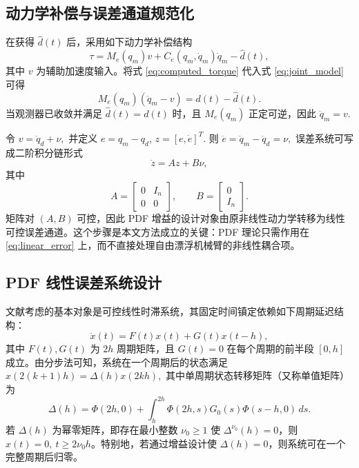 \subsection{动力学补偿与误差通道规范化}

在获得 \(\hat d(t)\) 后，采用如下动力学补偿结构
\begin{equation}
\tau=M_e(q_m)v+C_e(q_m,\dot q_m)\dot q_m-\hat d(t),
\label{eq:computed_torque}
\end{equation}
其中 \(v\) 为辅助加速度输入。将式 \eqref{eq:computed_torque} 代入式 \eqref{eq:joint_model} 可得
\[
M_e(q_m)(\ddot q_m-v)=d(t)-\hat d(t).
\]
当观测器已收敛并满足 \(\hat d(t)=d(t)\) 时，且 \(M_e(q_m)\) 正定可逆，因此
\(
\ddot q_m=v.
\)

令
\(
v=\ddot q_d+\nu ,
\)
并定义
\(
e=q_m-q_d\),
\(z=[e, \dot e]^T.
\)
则
\(
\ddot e=\ddot q_m-\ddot q_d=\nu,
\)
误差系统可写成二阶积分链形式
\begin{equation}
\dot z=Az+B\nu ,
\label{eq:linear_error}
\end{equation}
其中
\[
A=\begin{bmatrix}0&I_n\\0&0\end{bmatrix},\qquad
B=\begin{bmatrix}0\\I_n\end{bmatrix}.
\]
矩阵对 \((A,B)\) 可控，因此 PDF 增益的设计对象由原非线性动力学转移为线性可控误差通道。这个步骤是本文方法成立的关键：PDF 理论只需作用在 \eqref{eq:linear_error} 上，而不直接处理自由漂浮机械臂的非线性耦合项。

\subsection{PDF 线性误差系统设计}

文献\cite{zhouFixedtimeStabilizationLinear2022}考虑的基本对象是可控线性时滞系统，其固定时间镇定依赖如下周期延迟结构：
\begin{equation}
\dot x(t)=F(t)x(t)+G(t)x(t-h),
\label{eq:periodic_delay_general}
\end{equation}
其中 \(F(t),G(t)\) 为 \(2h\) 周期矩阵，且 \(G(t)=0\) 在每个周期的前半段 \([0,h]\) 成立。由分步法可知，系统在一个周期后的状态满足
\(
x(2(k+1)h)=\Delta(h)x(2kh),
\)
其中单周期状态转移矩阵（又称单值矩阵）为
\begin{equation}
\Delta(h)=\Phi(2h,0)+\int_h^{2h}\Phi(2h,s)G_0(s)\Phi(s-h,0)\,ds.
\label{eq:period_map}
\end{equation}
若 \(\Delta(h)\) 为幂零矩阵，即存在最小整数 \(\nu_0\ge1\) 使 \(\Delta^{\nu_0}(h)=0\)，则 \(x(t)=0,\ t\ge 2\nu_0h\)。特别地，若通过增益设计使 \(\Delta(h)=0\)，则系统可在一个完整周期后归零\cite{zhouFixedtimeStabilizationLinear2022}。

